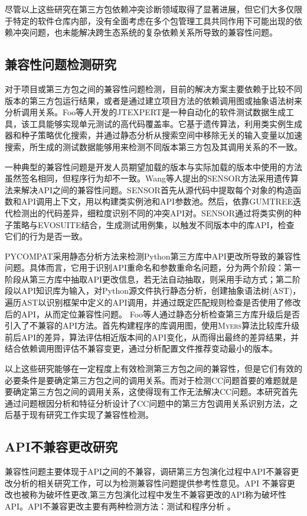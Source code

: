 尽管以上这些研究在第三方包依赖冲突诊断领域取得了显著进展，但它们大多仅限于特定的软件仓库内部，没有全面考虑在多个包管理工具共同作用下可能出现的依赖冲突问题，也未能解决跨生态系统的复杂依赖关系所导致的兼容性问题。
\subsection{兼容性问题检测研究}
对于项目或第三方包之间的兼容性问题检测，目前的解决方案主要依赖于比较不同版本的第三方包运行结果，或者是通过建立项目方法的依赖调用图或抽象语法树来分析调用关系。Foo等人开发的JTEXPERT是一种自动化的软件测试数据生成工具，该工具能够实现单元测试的高代码覆盖率。它基于遗传算法，利用类实例生成器和种子策略优化搜索，并通过静态分析从搜索空间中移除无关的输入变量以加速搜索，所生成的测试数据能够用来检测不同版本第三方包及其调用关系的不一致。

一种典型的兼容性问题是开发人员期望加载的版本与实际加载的版本中使用的方法虽然签名相同，但程序行为却不一致。Wang等人提出的\textsc{SENSOR}方法采用遗传算法来解决API之间的兼容性问题。\textsc{SENSOR}首先从源代码中提取每个对象的构造函数和API调用上下文，用以构建类实例池和API参数池。然后，依靠\textsc{GUMTREE}迭代检测出的代码差异，细粒度识别不同的冲突API对。\textsc{SENSOR}通过将类实例的种子策略与\textsc{EVOSUITE}结合，生成测试用例集，以触发不同版本中的库API，检查它们的行为是否一致。

\textsc{PYCOMPAT}采用静态分析方法来检测Python第三方库中API更改所导致的兼容性问题。具体而言，它用于识别API重命名和参数重命名问题，分为两个阶段：第一阶段从第三方库中抽取API更改信息，若无法自动抽取，则采用手动方式；第二阶段以API知识库为输入，对Python源文件执行静态分析，创建抽象语法树(AST)，遍历AST以识别框架中定义的API调用，并通过既定匹配规则检查是否使用了修改后的API，从而定位兼容性问题。 Foo等人通过静态分析检查第三方库升级后是否引入了不兼容的API方法。首先构建程序的库调用图，使用\textsc{Myers}算法比较库升级前后API的差异，算法评估相近版本间的API变化，从而得出最终的差异结果，并结合依赖调用图评估不兼容变更，通过分析配置文件推荐变动最小的版本。

以上这些研究能够在一定程度上有效检测第三方包之间的兼容性，但是它们有效的必要条件是要确定第三方包之间的调用关系。而对于检测CC问题首要的难题就是要确定第三方包之间的调用关系，这使得现有工作无法解决CC问题。本研究首先通过问题根因分析和特征分析设计了CC问题中的第三方包调用关系识别方法，之后基于现有研究工作实现了兼容性检测。
\subsection{API不兼容更改研究}
兼容性问题主要体现于API之间的不兼容，调研第三方包演化过程中API不兼容更改分析的相关研究工作，可以为检测兼容性问题提供参考性意见。API 不兼容更改也被称为破坏性更改,第三方包演化过程中发生不兼容更改的API称为破坏性API。API不兼容更改主要有两种检测方法：测试和程序分析 。

